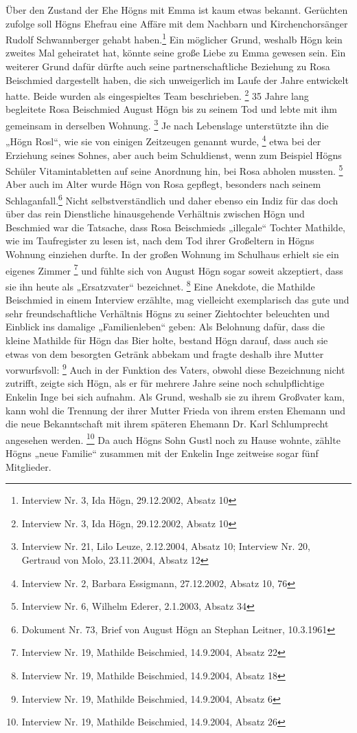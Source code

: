 Über den Zustand der Ehe Högns mit Emma ist kaum etwas bekannt.
Gerüchten zufolge soll Högns Ehefrau eine Affäre mit dem Nachbarn und
Kirchenchorsänger Rudolf Schwannberger gehabt haben.\footnote{
Interview Nr. 3, Ida Högn, 29.12.2002, Absatz 10} Ein möglicher Grund,
weshalb Högn kein zweites Mal geheiratet hat, könnte seine große Liebe
zu Emma gewesen sein. Ein weiterer Grund dafür dürfte auch seine
partnerschaftliche Beziehung zu Rosa Beischmied dargestellt haben, die
sich unweigerlich im Laufe der Jahre entwickelt hatte. Beide wurden als
eingespieltes Team beschrieben. \footnote{Interview Nr. 3, Ida Högn,
29.12.2002, Absatz 10} 35 Jahre lang begleitete Rosa Beischmied August
Högn bis zu seinem Tod und lebte mit ihm gemeinsam in derselben
Wohnung. \footnote{Interview Nr. 21, Lilo Leuze, 2.12.2004, Absatz 10;
Interview Nr. 20, Gertraud von Molo, 23.11.2004, Absatz 12} Je nach
Lebenslage unterstützte ihn die „Högn Rosl“, wie sie von einigen
Zeitzeugen genannt wurde, \footnote{Interview Nr. 2, Barbara Essigmann,
27.12.2002, Absatz 10, 76} etwa bei der Erziehung seines Sohnes, aber
auch beim Schuldienst, wenn zum Beispiel Högns Schüler Vitamintabletten
auf seine Anordnung hin, bei Rosa abholen mussten. \footnote{Interview
Nr. 6, Wilhelm Ederer, 2.1.2003, Absatz 34} Aber auch im Alter wurde
Högn von Rosa gepflegt, besonders nach seinem Schlaganfall.\footnote{
Dokument Nr. 73, Brief von August Högn an Stephan Leitner, 10.3.1961}
Nicht selbstverständlich und daher ebenso ein Indiz für das doch über
das rein Dienstliche hinausgehende Verhältnis zwischen Högn und
Beschmied war die Tatsache, dass Rosa Beischmieds „illegale“ Tochter
Mathilde, wie im Taufregister zu lesen ist, nach dem Tod ihrer
Großeltern in Högns Wohnung einziehen durfte. In der großen Wohnung im
Schulhaus erhielt sie ein eigenes Zimmer \footnote{Interview Nr. 19,
Mathilde Beischmied, 14.9.2004, Absatz 22} und fühlte sich von August
Högn sogar soweit akzeptiert, dass sie ihn heute als „Ersatzvater“
bezeichnet. \footnote{Interview Nr. 19, Mathilde Beischmied, 14.9.2004,
Absatz 18} Eine Anekdote, die Mathilde Beischmied in einem Interview
erzählte, mag vielleicht exemplarisch das gute und sehr
freundschaftliche Verhältnis Högns zu seiner Ziehtochter beleuchten und
Einblick ins damalige „Familienleben“ geben: Als Belohnung dafür, dass
die kleine Mathilde für Högn das Bier holte, bestand Högn darauf, dass
auch sie etwas von dem besorgten Getränk abbekam und fragte deshalb
ihre Mutter vorwurfsvoll:  \footnote{Interview Nr. 19, Mathilde Beischmied, 14.9.2004,
Absatz 6} Auch in der Funktion des Vaters, obwohl diese Bezeichnung
nicht zutrifft, zeigte sich Högn, als er für mehrere Jahre seine noch
schulpflichtige Enkelin Inge bei sich aufnahm. Als Grund, weshalb sie
zu ihrem Großvater kam, kann wohl die Trennung der ihrer Mutter Frieda
von ihrem ersten Ehemann und die neue Bekanntschaft mit ihrem späteren
Ehemann Dr. Karl Schlumprecht angesehen werden. \footnote{Interview Nr.
19, Mathilde Beischmied, 14.9.2004, Absatz 26} Da auch Högns Sohn Gustl
noch zu Hause wohnte, zählte Högns „neue Familie“ zusammen mit der
Enkelin Inge zeitweise sogar fünf Mitglieder.
